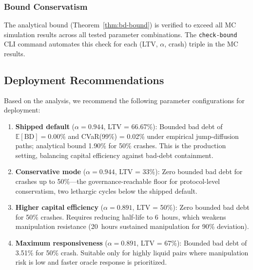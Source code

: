 \documentclass[10pt,a4paper,twocolumn]{article}
\begin{document}
\subsubsection{Bound Conservatism}
\label{subsec:bd-bound-validation}

The analytical bound (Theorem~\ref{thm:bd-bound}) is verified to exceed all MC simulation results across all tested parameter combinations. The \texttt{check-bound} CLI command automates this check for each (LTV, $\alpha$, crash) triple in the MC results.

\subsection{Deployment Recommendations}
\label{sec:bd-recommendations}

Based on the analysis, we recommend the following parameter configurations for deployment:

\begin{enumerate}[leftmargin=*]
\item \textbf{Shipped default} ($\alpha = 0.944$, LTV = 66.67\%): Bounded bad debt of $\mathbb{E}[\text{BD}] = 0.00\%$ and CVaR(99\%) = 0.02\% under empirical jump-diffusion paths; analytical bound 1.90\% for 50\% crashes. This is the production setting, balancing capital efficiency against bad-debt containment.

\item \textbf{Conservative mode} ($\alpha = 0.944$, LTV = 33\%): Zero bounded bad debt for crashes up to 50\%---the governance-reachable floor for protocol-level conservatism, two lethargic cycles below the shipped default.

\item \textbf{Higher capital efficiency} ($\alpha = 0.891$, LTV = 50\%): Zero bounded bad debt for 50\% crashes. Requires reducing half-life to 6~hours, which weakens manipulation resistance (20~hours sustained manipulation for 90\% deviation).

\item \textbf{Maximum responsiveness} ($\alpha = 0.891$, LTV = 67\%): Bounded bad debt of 3.51\% for 50\% crash. Suitable only for highly liquid pairs where manipulation risk is low and faster oracle response is prioritized.
\end{enumerate}
\end{document}
